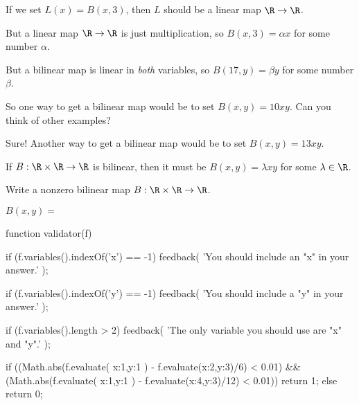 \documentclass{ximera}
\begin{document}
\begin{question}
  \begin{hint}
    If we set $L(x) = B(x,3)$, then $L$ should be a linear map $\R \to \R$.
  \end{hint}

  \begin{hint}
    But a linear map $\R \to \R$ is just multiplication, so $B(x,3) = \alpha x$ for some number $\alpha$.
  \end{hint}

  \begin{hint}
    But a bilinear map is linear in \textit{both} variables, so $B(17,y) = \beta y$ for some number $\beta$.
  \end{hint}

  \begin{hint}
    So one way to get a bilinear map would be to set $B(x,y) = 10 x y$.  Can you think of other examples?
  \end{hint}

  \begin{hint}
    Sure!  Another way to get a bilinear map would be to set $B(x,y) = 13 x y$.
  \end{hint}

  \begin{hint}
    If $B : \R \times \R \to \R$ is bilinear, then it must be $B(x,y) = \lambda x y$ for some $\lambda \in \R$.
  \end{hint}

  Write a nonzero bilinear map  $B: \R \times \R \to \R$.  
  \begin{solution}
    $B(x,y) = $ \begin{expression-answer}
  	function validator(f) {
    if (f.variables().indexOf('x') == -1) {
      feedback( 'You should include an "x" in your answer.' );
    }
    
     if (f.variables().indexOf('y') == -1) {
      feedback( 'You should include a "y" in your answer.' );
    }

    if (f.variables().length > 2) {
      feedback( 'The only variable you should use are "x" and "y".' );
    }

    if ((Math.abs(f.evaluate( {x:1,y:1} ) - f.evaluate({x:2,y:3})/6) < 0.01) &&
        (Math.abs(f.evaluate( {x:1,y:1} ) - f.evaluate({x:4,y:3})/12) < 0.01)) {
          return 1;
    } else {
      return 0;
    }
  }
    \end{expression-answer}
  \end{solution}
\end{question}
	
\end{document}
